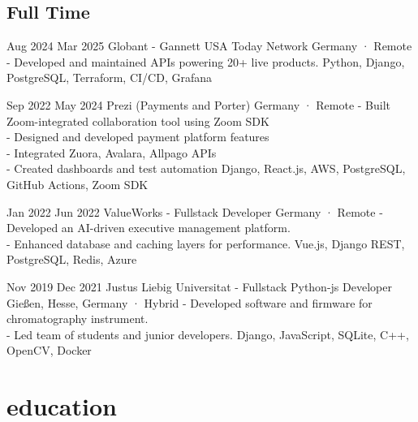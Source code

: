\documentclass[a4paper,nocolors]{friggeri-cv}
\begin{document}
\subsection{Full Time}

\begin{entrylist}


\entryexperience
{Aug 2024}
{Mar 2025}
{Globant - Gannett USA Today Network }
{Germany · Remote}
{
    - Developed and maintained APIs powering 20+ live products.
}
{Python, Django, PostgreSQL, Terraform, CI/CD, Grafana}

\entryexperience
{Sep 2022}
{May 2024}
{Prezi (Payments and Porter)}
{Germany · Remote}
{
    - Built Zoom-integrated collaboration tool using Zoom SDK\\
    - Designed and developed payment platform features\\
    - Integrated Zuora, Avalara, Allpago APIs\\
    - Created dashboards and test automation
}
{Django, React.js, AWS, PostgreSQL, GitHub Actions, Zoom SDK}


\entryexperience
{Jan 2022}
{Jun 2022}
{ValueWorks - Fullstack Developer}
{Germany · Remote}
{- Developed an AI-driven executive management platform.\\
- Enhanced database and caching layers for performance.}
{Vue.js, Django REST, PostgreSQL, Redis, Azure}

\entryexperience
{Nov 2019}
{Dec 2021}
{Justus Liebig Universitat - Fullstack Python-js Developer}
{Gießen, Hesse, Germany · Hybrid}
{- Developed software and firmware for chromatography instrument.\\
- Led team of students and junior developers.}
{Django, JavaScript, SQLite, C++, OpenCV, Docker}

\end{entrylist}

\vspace{-1em}
\section{education}
\end{document}
